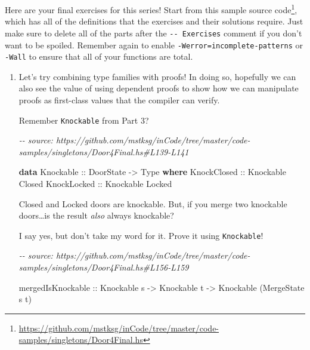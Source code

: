 \documentclass[]{article}
\newenvironment{Shaded}{}{}
\newcommand{\CommentTok}[1]{\textcolor[rgb]{0.38,0.63,0.69}{\textit{#1}}}
\newcommand{\DataTypeTok}[1]{\textcolor[rgb]{0.56,0.13,0.00}{#1}}
\newcommand{\KeywordTok}[1]{\textcolor[rgb]{0.00,0.44,0.13}{\textbf{#1}}}
\newcommand{\NormalTok}[1]{#1}
\newcommand{\OtherTok}[1]{\textcolor[rgb]{0.00,0.44,0.13}{#1}}
\renewcommand{\href}[2]{#2\footnote{\url{#1}}}
\begin{document}
Here are your final exercises for this series! Start from
\href{https://github.com/mstksg/inCode/tree/master/code-samples/singletons/Door4Final.hs}{this
sample source code}, which has all of the definitions that the exercises and
their solutions require. Just make sure to delete all of the parts after the
\texttt{-\/-\ Exercises} comment if you don't want to be spoiled. Remember again
to enable \texttt{-Werror=incomplete-patterns} or \texttt{-Wall} to ensure that
all of your functions are total.

\begin{enumerate}
\def\labelenumi{\arabic{enumi}.}
\item
  Let's try combining type families with proofs! In doing so, hopefully we can
  also see the value of using dependent proofs to show how we can manipulate
  proofs as first-class values that the compiler can verify.

  Remember \texttt{Knockable} from Part 3?

\begin{Shaded}
\begin{Highlighting}[]
\CommentTok{{-}{-} source: https://github.com/mstksg/inCode/tree/master/code{-}samples/singletons/Door4Final.hs\#L139{-}L141}

\KeywordTok{data} \DataTypeTok{Knockable}\OtherTok{ ::} \DataTypeTok{DoorState} \OtherTok{{-}>} \DataTypeTok{Type} \KeywordTok{where}
    \DataTypeTok{KnockClosed}\OtherTok{ ::} \DataTypeTok{Knockable} \DataTypeTok{\textquotesingle{}Closed}
    \DataTypeTok{KnockLocked}\OtherTok{ ::} \DataTypeTok{Knockable} \DataTypeTok{\textquotesingle{}Locked}
\end{Highlighting}
\end{Shaded}

  Closed and Locked doors are knockable. But, if you merge two knockable
  doors\ldots is the result \emph{also} always knockable?

  I say yes, but don't take my word for it. Prove it using \texttt{Knockable}!

\begin{Shaded}
\begin{Highlighting}[]
\CommentTok{{-}{-} source: https://github.com/mstksg/inCode/tree/master/code{-}samples/singletons/Door4Final.hs\#L156{-}L159}

\NormalTok{mergedIsKnockable}
\OtherTok{    ::} \DataTypeTok{Knockable}\NormalTok{ s}
    \OtherTok{{-}>} \DataTypeTok{Knockable}\NormalTok{ t}
    \OtherTok{{-}>} \DataTypeTok{Knockable}\NormalTok{ (}\DataTypeTok{MergeState}\NormalTok{ s t)}
\end{Highlighting}
\end{Shaded}


\end{enumerate}
\end{document}

